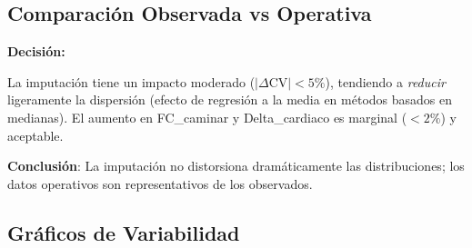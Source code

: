 \documentclass[12pt,letterpaper,twoside]{report}
\begin{document}
\subsection{Comparación Observada vs Operativa}

\begin{table}[H]
\centering
\caption{Coeficiente de Variación: Observado vs Operativo (promedio 10 usuarios)}
\label{tab:variability_dual}
\end{table}

\begin{decisionbox}
\textbf{Decisión:}

La imputación tiene un impacto moderado ($|\Delta\text{CV}| < 5\%$), tendiendo a \textit{reducir} ligeramente la dispersión (efecto de regresión a la media en métodos basados en medianas). El aumento en FC\_caminar y Delta\_cardiaco es marginal ($<2\%$) y aceptable.

\textbf{Conclusión}: La imputación no distorsiona dramáticamente las distribuciones; los datos operativos son representativos de los observados.
\end{decisionbox}

\subsection{Gráficos de Variabilidad}
\end{document}
